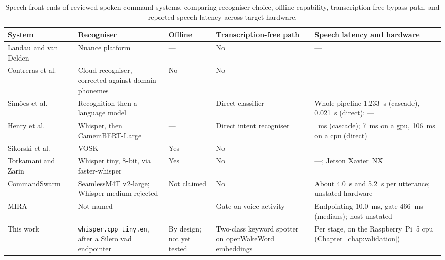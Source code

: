 \begin{table}[htbp]
\centering
\footnotesize
\caption[Speech front ends of spoken-command systems]{Speech front ends of reviewed spoken-command systems, comparing recogniser choice, offline capability, transcription-free bypass path, and reported speech latency across target hardware.}
\label{tab:soa-speech}
\begin{tabularx}{\textwidth}{@{}>{\raggedright\arraybackslash}p{2.3cm} >{\raggedright\arraybackslash}X >{\raggedright\arraybackslash}p{1.4cm} >{\raggedright\arraybackslash}p{2.4cm} >{\raggedright\arraybackslash}X@{}}
\toprule
System & Recogniser & Offline & Transcription-free path & Speech latency and hardware \\
\midrule
Landau and van Delden~\cite{landau2017} & Nuance platform & --- & No & --- \\
Contreras et al.~\cite{contreras2020} & Cloud recogniser, corrected against domain phonemes & No & No & --- \\
Sim\~oes et al.~\cite{simoes2024} & Recognition then a language model & --- & Direct classifier & Whole pipeline 1.233~s (cascade), 0.021~s (direct); --- \\
Henry et al.~\cite{henry2026} & Whisper, then CamemBERT-Large & --- & Direct intent recogniser & 202~ms (cascade); 7~ms on a \gls{gpu}, 106~ms on a \gls{cpu} (direct) \\
Sikorski et al.~\cite{sikorski2025} & VOSK & Yes & No & --- \\
Torkamani and Zarin~\cite{torkamani2025} & Whisper tiny, 8-bit, via faster-whisper & Yes & No & ---; Jetson Xavier~NX \\
Command\-Swarm~\cite{commandswarm2026} & SeamlessM4T v2-large; Whisper-medium rejected & Not claimed & No & About 4.0~s and 5.2~s per utterance; unstated hardware \\
MIRA~\cite{mira} & Not named & --- & Gate on voice activity & Endpointing 10.0~ms, gate 466~ms (medians); host unstated \\
\midrule
This work & \texttt{whisper.cpp tiny.en}, after a Silero \gls{vad} endpointer & By design; not yet tested & Two-class keyword spotter on openWakeWord embeddings & Per stage, on the Raspberry~Pi~5 \gls{cpu} (Chapter~\ref{chap:validation}) \\
\bottomrule
\end{tabularx}
\end{table}

